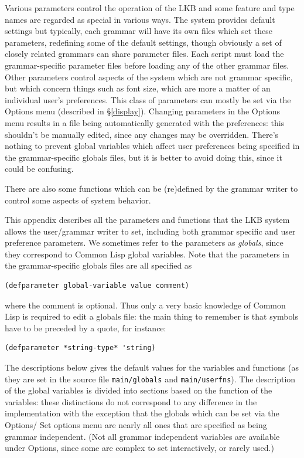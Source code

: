 \documentclass[12pt]{report}
\newcommand{\filename}[1]{{\tt #1}}
\newcommand{\lkbmenucommand}{{\bf}}
\newcommand{\newterm}[1]{{\it #1}}
\begin{document}
Various parameters control the operation of the LKB and some feature and
type names are regarded as special in various ways.
The system provides default settings
but typically, each grammar will have its own files which set these
parameters, redefining some of the default settings, though
obviously a set of closely related grammars can share parameter
files.  Each script must load the grammar-specific parameter files
before loading any of the other grammar files.
Other parameters control aspects of the system which
are not grammar specific, but which concern things such as 
font size, which are more a matter of an individual user's preferences.
This class of parameters can mostly be set via the {\lkbmenucommand Options}
menu (described in \S\ref{display}).
Changing parameters in the {\lkbmenucommand Options} menu results in
a file being automatically generated with the preferences:
this shouldn't be manually edited, since any changes may be 
overridden.  There's nothing to prevent global variables which affect
user preferences being specified in the grammar-specific globals
files, but it is better to avoid doing this, since it could be confusing.

There are also some functions which can be (re)defined
by the grammar writer to control some aspects of system behavior.

This appendix describes all the parameters and functions
that the LKB system allows the
user/grammar writer to set, including both grammar specific and
user preference parameters.
We sometimes refer to the parameters as \newterm{globals}, since they
correspond to Common Lisp global variables. 
Note that the parameters in the grammar-specific globals files are 
all specified as
\begin{verbatim}
(defparameter global-variable value comment)
\end{verbatim}
where the comment is optional.
Thus only a very basic knowledge of Common Lisp is required to
edit a globals file: the main thing to remember is that symbols
have to be preceded by a quote, for instance:
\begin{verbatim}
(defparameter *string-type* 'string)
\end{verbatim}

The descriptions below gives the
default values for the variables and functions
(as they are set in the source file
\filename{main/globals} and \filename{main/userfns}). 
The description of the global variables is divided into sections
based on the function of the variables: these 
distinctions do not correspond to any difference in the implementation
with the exception that the globals which can be set via the
{\lkbmenucommand Options}/ {\lkbmenucommand Set options}
menu are nearly all ones that are specified as being
grammar independent.  (Not all grammar independent variables
are available under {\lkbmenucommand Options}, since some are complex to set
interactively, or rarely used.)
\end{document}
